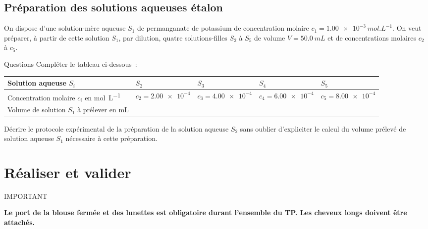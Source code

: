 \documentclass[a4paper, 11pt, final, garamond]{book}
\begin{document}
\subsection{Préparation des solutions aqueuses étalon}

On dispose d'une solution-mère aqueuse $S_1$ de permanganate de potassium de concentration molaire
$c_1 = \SI{1.00e-3}{mol.L^{-1}}$. On veut préparer, à partir de cette solution
$S_1$, par dilution, quatre solutions-filles $S_2$ à $S_5$ de volume $V = \SI{50.0}{mL}$ et de concentrations molaires $c_2$ à $c_5$.

\begin{rexem}{Questions}
    Compléter le tableau ci-dessous~:

    \begin{center}
        \begin{tabularx}{\linewidth}{|Y*{4}{|Y}|}\hline
            Solution aqueuse $S_i$ &
            $S_2$ & $S_3$ & $S_4$ & $S_5$
            \\\hline
            Concentration molaire $c_i$ en \si{mol.L^{-1}} &
            $c_2 = \num{2.00e-4}$ & $c_3 = \num{4.00e-4}$ & $c_4 = \num{6.00e-4}$ & $c_5
            = \num{8.00e-4}$
            \\\hline
            Volume de solution $S_1$ à prélever en \si{mL} &
                                                           & & &
            \\\hline
        \end{tabularx}
    \end{center}

    Décrire le protocole expérimental de la préparation de la solution aqueuse
    $S_2$ sans oublier d'expliciter le calcul du volume prélevé de solution
    aqueuse $S_1$ nécessaire à cette préparation.
\end{rexem}

\section{Réaliser et valider}

\begin{NCror}[width=\linewidth]{IMPORTANT}
    \begin{center}
        \bfseries
        Le port de la blouse fermée et des lunettes est obligatoire durant
        l'ensemble du TP. Les cheveux longs doivent être attachés.
    \end{center}
\end{NCror}
\end{document}
